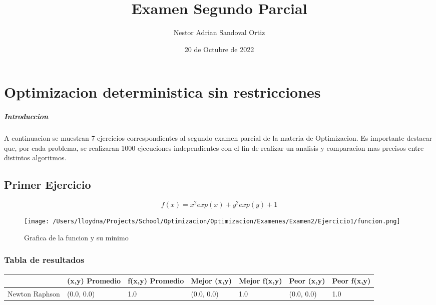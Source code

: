 \documentclass{report}
\title{Examen Segundo Parcial}
\date{20 de Octubre de 2022}
\author{Nestor Adrian Sandoval Ortiz}
\begin{document}
    \maketitle
    \chapter{Optimizacion deterministica sin restricciones}
        \paragraph{Introduccion}
        A continuacion se muestran 7 ejercicios correspondientes al segundo examen parcial de la
        materia de Optimizacion. Es importante destacar que, por cada problema, se realizaran 1000
        ejecuciones independientes con el fin de realizar un analisis y comparacion mas precisos entre
        distintos algoritmos.

        \pagebreak

        \section{Primer Ejercicio}
            \begin{equation*}
                f(x)=x^2exp(x)+y^2exp(y)+1 
            \end{equation*}

            \begin{figure}[H]
                \texttt{[image: /Users/lloydna/Projects/School/Optimizacion/Optimizacion/Examenes/Examen2/Ejercicio1/funcion.png]}
                \caption{Grafica de la funcion y su minimo}
                \label{fig:fun11}
            \end{figure}

            \subsection{Tabla de resultados}
                \begin{tabular}{l|p{1.5cm}|p{1.5cm}|p{1.5cm}|p{1.5cm}|p{1.5cm}|p{1.5cm}}
                    & (x,y) Promedio & f(x,y) Promedio & Mejor (x,y) & Mejor f(x,y) & Peor (x,y) & Peor f(x,y)\\
                    \hline
                    Newton Raphson & (0.0, 0.0) & 1.0 & (0.0, 0.0) & 1.0 & (0.0, 0.0) & 1.0\\
                    \hline
                \end{tabular}
\end{document}
